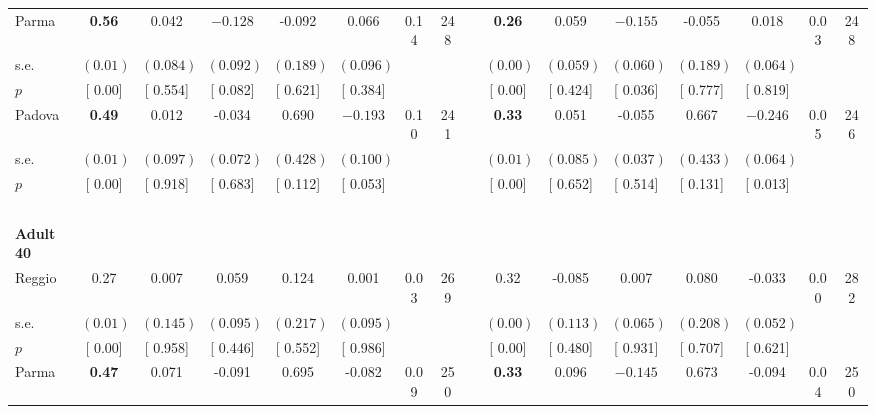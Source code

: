 \begin{longtable}{L{8em} c c c c c c c p{1em} c c c c c c c}
\quad \quad \quad Parma& \textbf{     0.56} &     0.042 & $ \mathbf{   -0.128}$ &    -0.092 &     0.066 &      0.14 &       248 & & \textbf{     0.26} &     0.059 & $ \mathbf{   -0.155}$ &    -0.055 &     0.018 &      0.03 &       248  \\*
\quad \quad \quad \quad s.e.& $ (     0.01)$ & $ (    0.084)$ & $ (    0.092)$ & $ (    0.189)$ & $ (    0.096)$ & & & & $ (     0.00)$ & $ (    0.059)$ & $ (    0.060)$ & $ (    0.189)$ & $ (    0.064)$ & &  \\*
\quad \quad \quad \quad $ p$ & [     0.00] & [    0.554] & [    0.082] & [    0.621] & [    0.384] & & & & [     0.00] & [    0.424] & [    0.036] & [    0.777] & [    0.819] & &  \\[1em]
\quad \quad \quad Padova& \textbf{     0.49} &     0.012 &    -0.034 &     0.690 & $ \mathbf{   -0.193}$ &      0.10 &       241 & & \textbf{     0.33} &     0.051 &    -0.055 &     0.667 & $ \mathbf{   -0.246}$ &      0.05 &       246  \\*
\quad \quad \quad \quad s.e.& $ (     0.01)$ & $ (    0.097)$ & $ (    0.072)$ & $ (    0.428)$ & $ (    0.100)$ & & & & $ (     0.01)$ & $ (    0.085)$ & $ (    0.037)$ & $ (    0.433)$ & $ (    0.064)$ & &  \\*
\quad \quad \quad \quad $ p$ & [     0.00] & [    0.918] & [    0.683] & [    0.112] & [    0.053] & & & & [     0.00] & [    0.652] & [    0.514] & [    0.131] & [    0.013] & &  \\[1em]
~\\[1em]
\quad \quad \textbf{Adult 40} & & & & & & & & & & & & & & & \\* 
\quad \quad \quad Reggio& 0.27 &     0.007 &     0.059 &     0.124 &     0.001 &      0.03 &       269 & & 0.32 &    -0.085 &     0.007 &     0.080 &    -0.033 &      0.00 &       282  \\*
\quad \quad \quad \quad s.e.& $ (     0.01)$ & $ (    0.145)$ & $ (    0.095)$ & $ (    0.217)$ & $ (    0.095)$ & & & & $ (     0.00)$ & $ (    0.113)$ & $ (    0.065)$ & $ (    0.208)$ & $ (    0.052)$ & &  \\*
\quad \quad \quad \quad $ p$ & [     0.00] & [    0.958] & [    0.446] & [    0.552] & [    0.986] & & & & [     0.00] & [    0.480] & [    0.931] & [    0.707] & [    0.621] & &  \\[1em]
\quad \quad \quad Parma& \textbf{     0.47} &     0.071 &    -0.091 &     0.695 &    -0.082 &      0.09 &       250 & & \textbf{     0.33} &     0.096 & $ \mathbf{   -0.145}$ &     0.673 &    -0.094 &      0.04 &       250  \\*

\end{longtable}
